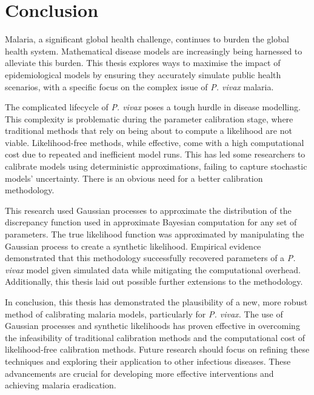 \chapter{Conclusion}

Malaria, a significant global health challenge, continues to burden the 
global health system. Mathematical disease models are increasingly being 
harnessed to alleviate this burden. This thesis explores ways to maximise 
the impact of epidemiological models by ensuring they accurately simulate 
public health scenarios, with a specific focus on the complex issue of 
\textit{P. vivax} malaria. 

The complicated lifecycle of \textit{P. vivax} poses a tough hurdle in 
disease modelling. This complexity is problematic during the parameter 
calibration stage, where traditional methods that rely on being about to 
compute a likelihood are not viable. Likelihood-free methods, while effective, 
come with a high computational cost due to repeated and inefficient model runs. 
This has led some researchers to calibrate models using deterministic 
approximations, failing to capture stochastic models' uncertainty. 
There is an obvious need for a better calibration methodology.

This research used Gaussian processes to approximate the distribution of the 
discrepancy function used in approximate Bayesian computation for any set of 
parameters. The true likelihood function was approximated by manipulating the 
Gaussian process to create a synthetic likelihood. Empirical evidence 
demonstrated that this methodology successfully recovered parameters of a 
\textit{P. vivax} model given simulated data while mitigating the 
computational overhead. Additionally, this thesis laid out possible further 
extensions to the methodology.

In conclusion, this thesis has demonstrated the plausibility of a new, 
more robust method of calibrating malaria models, particularly for 
\textit{P. vivax.} The use of Gaussian processes and synthetic likelihoods has 
proven effective in overcoming the infeasibility of traditional calibration 
methods and the computational cost of likelihood-free calibration methods. 
Future research should focus on refining these techniques and exploring their 
application to other infectious diseases. These advancements are crucial for 
developing more effective interventions and achieving malaria eradication.